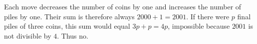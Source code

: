 Each move decreases the number of coins by one and increases the number of piles by one. Their sum is therefore always $2000+1=2001$. If there were $p$ final piles of three coins, this sum would equal $3p+p=4p$, impossible because $2001$ is not divisible by $4$. Thus $\boxed{\text{no}}$.
